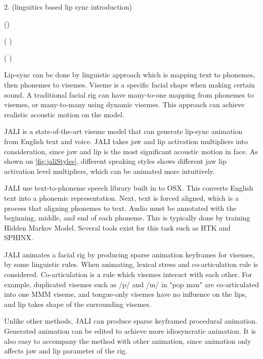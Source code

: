 \documentclass[10pt,twocolumn,letterpaper]{article}
\begin{document}
2. 
(linguitics based lip sync introduction)

()

(  )

(  )



Lip-sync can be done by linguistic approach which is mapping text to phonemes, then phonemes to visemes\cite{ezzatMikeTalkTalkingFacial1998}. Viseme is a specific facial shape when making certain sound. A traditional facial rig can have many-to-one mapping from phonemes to visemes, or many-to-many using dynamic visemes. This approach can achieve realistic acoustic motion on the model.

JALI\cite{edwardsJALIAnimatorcentricViseme2016} is a state-of-the-art viseme model that can generate lip-sync animation from English text and voice. JALI takes jaw and lip activation multipliers into consideration, since jaw and lip is the most significant acoustic motion in face. As shown on \cref{fig:jaliStyles}, different speaking styles shows different jaw lip activation level multipliers, which can be animated more intuitively.

JALI use text-to-phoneme speech library built in to OSX. This converts English text into a phonemic representation. Next, text is forced aligned, which is a process that aligning phonemes to text. Audio must be annotated with the beginning, middle, and end of each phoneme. This is typically done by training Hidden Markov Model. Several tools exist for this task such as HTK and SPHINX.

JALI animates a facial rig by producing sparse animation keyframes for visemes, by some linguistic rules. When animating, lexical stress and co-articulation rule is considered. Co-articulation is a rule which visemes interact with each other. For example, duplicated visemes such as /p/ and /m/ in "pop man" are co-articulated into one MMM viseme, and tongue-only visemes have no influence on the lips, and lip takes shape of the surrounding visemes.


Unlike other methods, JALI can produce sparse keyframed procedural animation. Generated animation can be edited to achieve more idiosyncratic animation. It is also easy to accompany the method with other animation, since animation only affects jaw and lip parameter of the rig.
\end{document}
